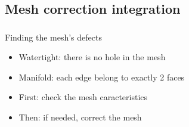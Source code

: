 \documentclass{beamer}
\begin{document}
\subsection{Mesh correction integration}

\begin{frame}
	\frametitle{}

    \begin{block}{Finding the mesh's defects}
		\begin{itemize}
		    \item Watertight: there is no hole in the mesh
            \item Manifold: each edge belong to exactly 2 faces
		    \item First: check the mesh caracteristics
			\item Then: if needed, correct the mesh
		\end{itemize}
    \end{block}

\end{frame}
\end{document}
